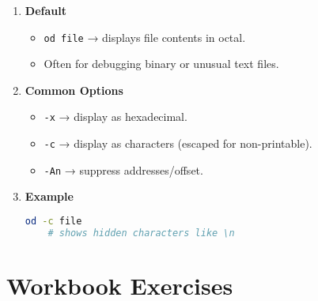 \documentclass[a4paper]{report}
\begin{document}
\begin{enumerate}
    \item \textbf{Default}
    \begin{itemize}
        \item \texttt{od file} → displays file contents in octal.
        \item Often for debugging binary or unusual text files.
    \end{itemize}
    \item \textbf{Common Options}
    \begin{itemize}
        \item \texttt{-x} → display as hexadecimal.
        \item \texttt{-c} → display as characters (escaped for non-printable).
        \item \texttt{-An} → suppress addresses/offset.
    \end{itemize}
    \item \textbf{Example}
    \begin{lstlisting}[language=bash]
    od -c file
    # shows hidden characters like \n
    \end{lstlisting}
\end{enumerate}



\section*{Workbook Exercises}
\end{document}
